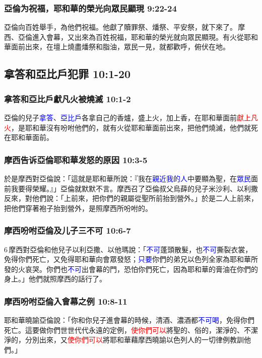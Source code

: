 \subsubsection{亞倫为祝福，耶和華的榮光向眾民顯現 9:22-24}
亞倫向百姓舉手，為他們祝福。他獻了贖罪祭、燔祭、平安祭，就下來了。 摩西、亞倫進入會幕，又出來為百姓祝福，耶和華的榮光就向眾民顯現。有火從耶和華面前出來，在壇上燒盡燔祭和脂油，眾民一見，就都歡呼，俯伏在地。

\subsection{拿答和亞比戶犯罪 10:1-20}
\subsubsection{拿答和亞比戶獻凡火被燒滅 10:1-2}
亞倫的兒子\textcolor{blue}{拿答}、\textcolor{blue}{亞比戶}各拿自己的香爐，盛上火，加上香，在耶和華面前\textcolor{red}{獻上凡火}，是耶和華沒有吩咐他們的，就有火從耶和華面前出來，把他們燒滅，他們就死在耶和華面前。

\subsubsection{摩西告诉亞倫耶和華发怒的原因 10:3-5}
於是摩西對亞倫說：「這就是耶和華所說：『我在\textcolor{blue}{親近我的人}中要顯為聖，在\textcolor{blue}{眾民}面前我要得榮耀。』」亞倫就默默不言。摩西召了亞倫叔父烏薛的兒子米沙利、以利撒反來，對他們說：「上前來，把你們的親屬從聖所前抬到營外。」於是二人上前來，把他們穿著袍子抬到營外，是照摩西所吩咐的。 

\subsubsection{摩西吩咐亞倫及儿子三不可 10:6-7}
6 摩西對亞倫和他兒子以利亞撒、以他瑪說：「\textcolor{blue}{不可}蓬頭散髮，也\textcolor{blue}{不可}撕裂衣裳，免得你們死亡，又免得耶和華向會眾發怒；\textcolor{blue}{只要}你們的弟兄以色列全家為耶和華所發的火哀哭。你們也\textcolor{blue}{不可}出會幕的門，恐怕你們死亡，因為耶和華的膏油在你們的身上。」他們就照摩西的話行了。

\subsubsection{摩西吩咐亞倫入會幕之例 10:8-11}
耶和華曉諭亞倫說：「你和你兒子進會幕的時候，清酒、濃酒都\textcolor{blue}{不可喝}，免得你們死亡。這要做你們世世代代永遠的定例，\textcolor{red}{使你們可以}將聖的、俗的，潔淨的、不潔淨的，分別出來，又\textcolor{red}{使你們可以}將耶和華藉摩西曉諭以色列人的一切律例教訓他們。」

